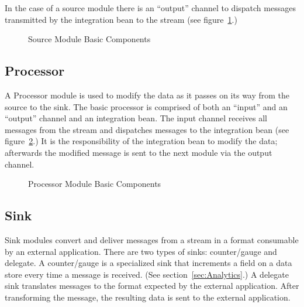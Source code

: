 \par

In the case of a source module there is an ``output'' channel to dispatch messages 
transmitted by the integration bean to the stream (see figure~\ref{fig:sourcembc}.)

\par

\begin{figure}[ht]
\centering
{}
\caption{Source Module Basic Components}
\label{fig:sourcembc}
\end{figure}

\par

\subsection{Processor}
A Processor module is used to modify the data as it passes on its way from the source to
the sink.  The basic processor is comprised of both an ``input'' and an ``output'' channel
and an integration bean.
The input channel receives all messages from the stream and dispatches
messages to the integration bean (see figure~\ref{fig:processormbc}.) It is the
responsibility of the integration bean to modify the data; afterwards the modified
message is sent to the next module via the output channel.

\par

\begin{figure}
\centering
{}
\caption{Processor Module Basic Components}
\label{fig:processormbc}
\end{figure}

\par

\subsection{Sink}
Sink modules convert and deliver messages from a stream in a format consumable by 
an external application.  There are two types of sinks: counter/gauge and delegate.
A counter/gauge is a specialized sink that increments a field on a data store every time a
message is received. (See section~\ref{sec:Analytics}.) A delegate
sink translates messages to the format expected by the external application.
After transforming the message, the resulting data is sent to the external application.

